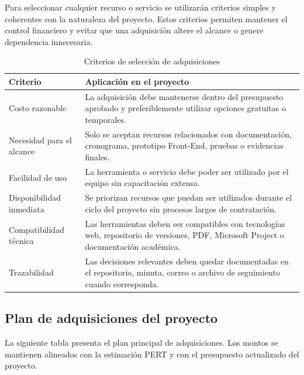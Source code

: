 \documentclass[11pt,spanish]{article}
\begin{document}
Para seleccionar cualquier recurso o servicio se utilizarán criterios simples y coherentes con la naturaleza del proyecto. Estos criterios permiten mantener el control financiero y evitar que una adquisición altere el alcance o genere dependencia innecesaria.

\begin{table}[H]
\centering
\caption{Criterios de selección de adquisiciones}
\label{tab:criterios-adquisiciones}
{\small
\begin{tabularx}{\textwidth}{p{4cm} Y}
\toprule
\textbf{Criterio} & \textbf{Aplicación en el proyecto} \\
\midrule
Costo razonable & La adquisición debe mantenerse dentro del presupuesto aprobado y preferiblemente utilizar opciones gratuitas o temporales. \\
Necesidad para el alcance & Solo se aceptan recursos relacionados con documentación, cronograma, prototipo Front-End, pruebas o evidencias finales. \\
Facilidad de uso & La herramienta o servicio debe poder ser utilizado por el equipo sin capacitación extensa. \\
Disponibilidad inmediata & Se priorizan recursos que puedan ser utilizados durante el ciclo del proyecto sin procesos largos de contratación. \\
Compatibilidad técnica & Las herramientas deben ser compatibles con tecnologías web, repositorio de versiones, PDF, Microsoft Project o documentación académica. \\
Trazabilidad & Las decisiones relevantes deben quedar documentadas en el repositorio, minuta, correo o archivo de seguimiento cuando corresponda. \\
\bottomrule
\end{tabularx}
}
\end{table}

\subsection{Plan de adquisiciones del proyecto}

La siguiente tabla presenta el plan principal de adquisiciones. Los montos se mantienen alineados con la estimación PERT y con el presupuesto actualizado del proyecto.
\end{document}
